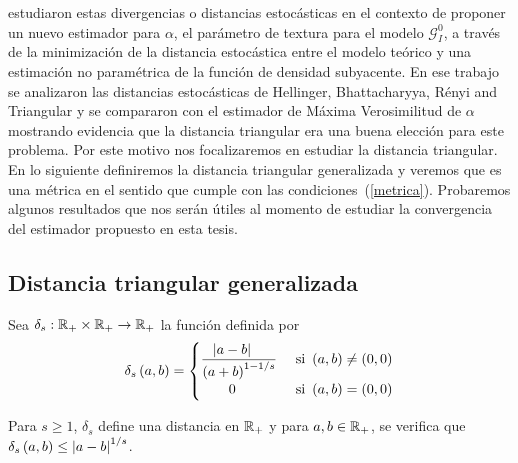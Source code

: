 \citet{APSAR2013ParameterEstimationStochasticDistances} estudiaron estas divergencias o distancias estocásticas en el contexto de proponer un nuevo estimador para $\alpha$, el parámetro de textura para el modelo $\mathcal{G}_I^0$, a través de la minimización de la distancia estocástica entre el modelo teórico y una estimación no paramétrica de la función de densidad subyacente. En ese trabajo se analizaron las distancias estocásticas de Hellinger, Bhattacharyya, R\'enyi and Triangular y se compararon con el estimador de Máxima Verosimilitud de $\alpha$ mostrando evidencia que la distancia triangular era una buena elección para este problema. 
Por este motivo nos focalizaremos en estudiar la distancia triangular. 
En lo siguiente definiremos la distancia triangular generalizada y veremos que es una métrica en el sentido que cumple con las condiciones~(\ref{metrica}). 
Probaremos algunos resultados que nos serán útiles al momento de estudiar la convergencia del estimador propuesto en esta tesis.

\subsection{Distancia triangular generalizada}

Sea $\delta_{s}:\mathbb{R}_{+}\times\mathbb{R}_{+}\to\mathbb{R}_{+}$ la función definida por
\begin{align*}
\delta_{s}\left( a,b \right) = 
\begin{cases}
\dfrac{\left| a - b \right|\ \ \ }{\left( a + b \right)^{1-1/s}} & \text{ si } \left( a,b \right) \ne \left( 0,0 \right) \\
\qquad 0 &  \text{ si } \left( a,b \right) = \left( 0,0 \right)
\end{cases}
\end{align*}

\begin{lemma}
	Para $s\ge 1$, $\delta_{s}$ define una distancia en $\mathbb{R}_{+}$ y para $a,b\in\mathbb{R}_{+}$, se verifica que $\delta_{s}\left( a,b \right) \le \left| a-b \right|^{1/s}$.
\end{lemma}

